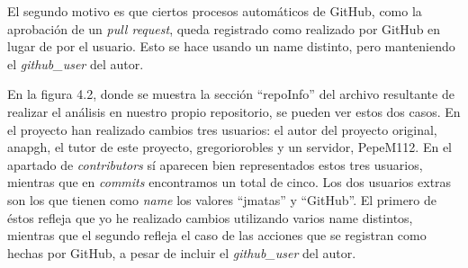 \documentclass[a4paper, 12pt]{book}
\begin{document}
\begin{itemize}
\begin{enumerate}
\begin{itemize}
            El segundo motivo es que ciertos procesos automáticos de GitHub, como la aprobación de un \textit{pull request}, queda registrado como realizado por GitHub en lugar de por el usuario. Esto se hace usando un name distinto, pero manteniendo el \textit{github\_user} del autor.

            En la figura 4.2, donde se muestra la sección ``repoInfo'' del archivo resultante de realizar el análisis en nuestro propio repositorio, se pueden ver estos dos casos. En el proyecto han realizado cambios tres usuarios: el autor del proyecto original, anapgh, el tutor de este proyecto, gregoriorobles y un servidor, PepeM112. En el apartado de \textit{contributors} sí aparecen bien representados estos tres usuarios, mientras que en \textit{commits} encontramos un total de cinco. Los dos usuarios extras son los que tienen como \textit{name} los valores ``jmatas'' y ``GitHub''. El primero de éstos refleja que yo he realizado cambios utilizando varios name distintos, mientras que el segundo refleja el caso de las acciones que se registran como hechas por GitHub, a pesar de incluir el \textit{github\_user} del autor.
\newpage
\begin{figure} [H]
    \centering

\end{figure}
\end{itemize}
\end{enumerate}
\end{itemize}
\end{document}
